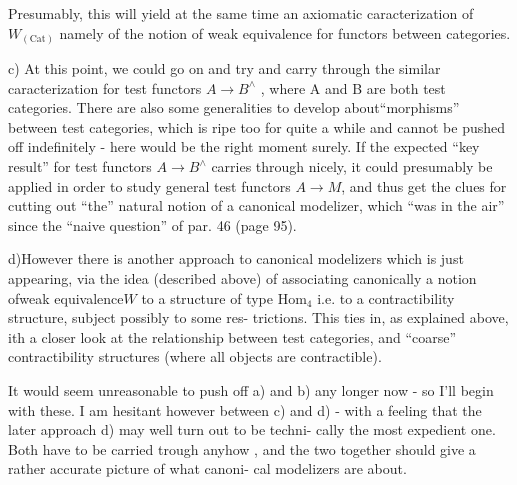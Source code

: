 
Presumably,  this will yield at the same time an axiomatic caracterization
of  $W_{(\mathrm{Cat})}$ namely of the notion of weak equivalence for functors between
categories.

c) At this point,  we could go on and try and carry through the similar
caracterization for test functors $A\to B^\wedge$ ,  where A and B are both test
categories.  There are also some generalities to develop about``morphisms''
between test categories,  which is ripe too for quite a while and cannot
be pushed off indefinitely  -  here would be the right moment surely.
If the expected ``key result'' for test functors $A\to B^\wedge$ carries through
nicely,  it could presumably be applied  in order to study general test
functors $A\to M$,  and thus get the clues for cutting out ``the'' natural
notion of a canonic\hand{\unsure{-}}al modelizer,  which ``was in the air'' since the ``naive
question'' of par. 46 (page 95).
 

d)However there is another approach to canonical modelizers which is
just appearing,  via the idea (described above) of associating canonically
a notion ofweak equivalence$W$ to a  structure  of type
$\mathrm{Hom}_4$ i.e. to a contractibility structure,  subject possibly to some res-%
trictions.  This ties in,  as explained above,  ith a closer look at
the relationship between test categories,  and ``coarse'' contractibility
structures (where all objects are contractible).

It would seem unreasonable to push off a) and b)  any longer now -
so I'll begin with these.  I am hesitant however between c) and d)  -
with a feeling that the later approach d) may well turn out to be techni-%
cally the most expedient one.  Both have to be carried trough anyhow ,
and the two together should give a rather accurate picture of what canoni-%
cal modelizers are about.

